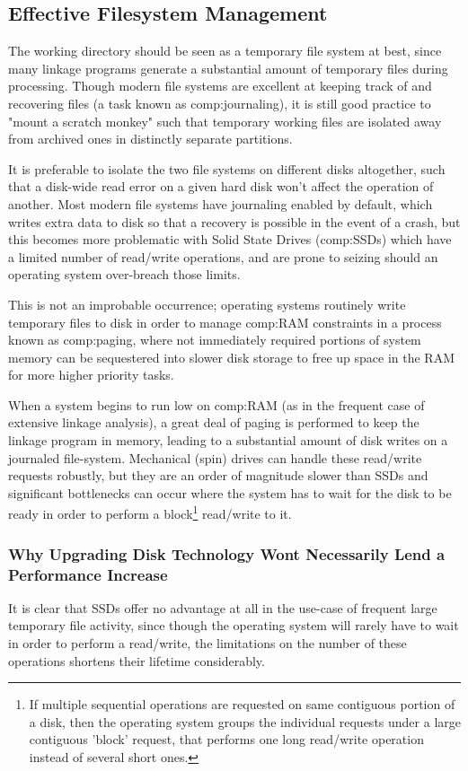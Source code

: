 \subsection{Effective Filesystem Management}

The working directory should be seen as a temporary file system at best, since many linkage programs generate a substantial amount of temporary files during processing. Though modern file systems are excellent at keeping track of and recovering files (a task known as \gls{comp:journaling}), it is still good practice to "mount a scratch monkey" such that temporary working files are isolated away from archived ones in distinctly separate partitions.

It is preferable to isolate the two file systems on different disks altogether, such that a disk-wide read error on a given hard disk won't affect the operation of another. Most modern file systems have journaling enabled by default, which writes extra data to disk so that a recovery is possible in the event of a crash, but this becomes more problematic with Solid State Drives (\gls{comp:SSD}s) which have a limited number of read/write operations, and are prone to seizing should an operating system over-breach those limits.

This is not an improbable occurrence; operating systems routinely write temporary files to disk in order to manage \gls{comp:RAM} constraints in a process known as \gls{comp:paging}, where not immediately required portions of system memory can be sequestered into slower disk storage to free up space in the RAM for more higher priority tasks.

When a system begins to run low on \gls{comp:RAM} (as in the frequent case of extensive linkage analysis), a great deal of paging is performed to keep the linkage program in memory, leading to a substantial amount of disk writes on a journaled file-system. Mechanical (spin) drives can handle these read/write requests robustly, but they are an order of magnitude slower than SSDs and significant bottlenecks can occur where the system has to wait for the disk to be ready in order to perform a block\footnote{If multiple sequential operations are requested on same contiguous portion of a disk, then the operating system groups the individual requests under a large contiguous 'block' request, that performs one long read/write operation instead of several short ones.}    read/write to it.


\subsubsection{Why Upgrading Disk Technology Wont Necessarily Lend a Performance Increase}
It is clear that SSDs offer no advantage at all in the use-case of frequent large temporary file activity, since though the operating system will rarely have to wait in order to perform a read/write, the limitations on the number of these operations shortens their lifetime considerably.

